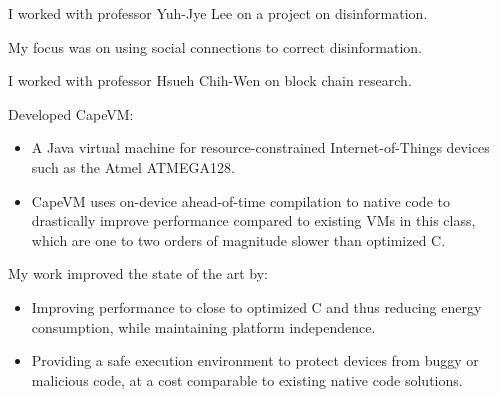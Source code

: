 \documentclass[10pt,a4paper]{../altacv}
\begin{document}
\medskip




\medskip\medskip{}

I worked with professor Yuh-Jye Lee on a project on disinformation.

My focus was on using social connections to correct disinformation.

\medskip




\medskip\medskip{}

I worked with professor Hsueh Chih-Wen on block chain research.

\medskip




\medskip\medskip{}

Developed CapeVM:
\begin{itemize}
    \item\small{A Java virtual machine for resource-constrained Internet-of-Things devices such as the Atmel ATMEGA128.}
    \item\small{CapeVM uses on-device ahead-of-time compilation to native code to drastically improve performance compared to existing VMs in this class, which are one to two orders of magnitude slower than optimized C.}
\end{itemize}

My work improved the state of the art by:
\begin{itemize}
    \item\small{Improving performance to close to optimized C and thus reducing energy consumption, while maintaining platform independence.}
    \item\small{Providing a safe execution environment to protect devices from buggy or malicious code, at a cost comparable to existing native code solutions.}
\end{itemize}
\end{document}
